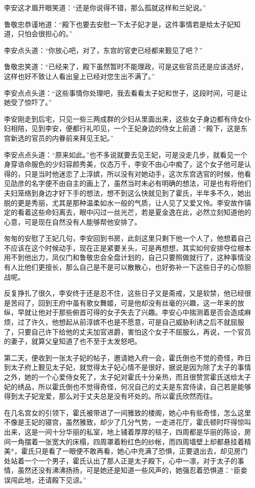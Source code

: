 李安这才眉开眼笑道：“还是你说得不错，那么孤就这样和兰妃说。”

鲁敬忠恭谨地道：“殿下也要去安慰一下太子妃才是，这件事情若是给太子妃知道，只怕会很担心的。”

李安点头道：“你放心吧，对了，东宫的官吏已经都来觐见了吧？”

鲁敬忠笑道：“已经来了，殿下虽然暂时不能理政，可是这些官员还是应该选好，这样也好不致让人看出皇上已经对您生出不满了。”

李安点点头道：“这些事情你处理吧，我去看看太子妃和世子，这段时间，可是让她受了惊吓了。”

李安刚走到后宅，只见一些三两成群的少妇从里面出来，这些女子身边都有侍女仆妇相陪，见到李安，便都行礼叩见，一个王妃身边的侍女上前道：“殿下，这是东宫新选的官员的内眷前来拜见王妃。”

李安点点头道：“原来如此。”也不多说就要去见王妃，可是没走几步，就看见一个身穿诰命服色的少妇容颜秀美，仪态万千，李安不由心中痴了，这个女子他可是认得的，只是当时他迷恋了上淳嫔，所以没有对她动手，这次东宫选官的时候，他看见劭彦的名字便不由自主的画上了，虽然当时未必有明确的想法，可是也有将他们夫妇笼络到身边才好下手的想法，想不到这么快就见到了霍氏，半年多不久，她出脱的更是秀丽，尤其是那种温柔如水一般的气质，让人见了又爱又怜。李安故作镇定的看着这些命妇离去，眼中闪过一丝光芒，若是夏金逸在此，必然立刻知道他的心意，可是现在自然没有人能够帮他安排了。

匆匆的安慰了王妃几句，李安回到书房，此刻这里只剩下他一个人了，他想着自己不应该在这个时候动手，现在正是紧要关头，可是再想想，其实如何安排夺位根本用不到他出力，凤仪门和鲁敬忠会全盘计划的，自己只要照做就行了，这种事情没有人比他们更擅长，那么自己是不是可以散散心，也好弥补一下这些日子的心惊胆战呢。

反复挣扎了很久，李安终于还是忍不住，这些日子又是斋戒，又是软禁，他已经很是苦闷了，回到王府中虽有歌女舞姬，可是他却没有丝毫的兴趣，这一年来的放纵，早就让他对于那些俯首可得的女子失去了兴趣。李安心中揣测着是否会造成麻烦，过了许久，他想起从前淳嫔不也是不愿意，可是自己威胁利诱之后不就屈服了，只要自己许下给他的丈夫加官进爵，害怕这个女子不屈服么，再说，一个官员的妻子，就算父皇知道了也不至于太发怒吧。

第二天，便收到一张太子妃的帖子，邀请她入府一会，霍氏倒也不觉的奇怪，昨日到太子府上觐见太子妃，就觉得太子妃心情不是很好，据说是因为除了太子的事情之外，她的一个心爱侍女死了，太子妃对霍氏十分亲热，而且很赞赏霍氏送给太子妃的绣品，所以霍氏倒也不觉得奇怪，何况自己的丈夫是东宫侍读，自己若是能够得到太子妃宠爱，那么对于丈夫总是没有坏处的。所以霍氏欣然而往。

在几名宫女的引领下，霍氏被带进了一间雅致的楼阁，她心中有些奇怪，怎么这里不像是王妃的寝宫，虽然雅致，却少了几分气势，一走进花厅，霍氏顿时吓得惊叫出来，这是一间十分华丽的私室，地上铺着厚厚的毯子，四周都是华丽的陈设，房间一角摆着一张宽大的床榻，四周罩着粉红色的纱帐，而四周墙壁上却都悬挂着精美*，霍氏只是看了一眼便不敢再看，她心中充满了恐惧，正要退出去，却见房门处站着一个一个男子，霍氏认出了那人正是太子殿下，心中一凛，对于太子的事情，虽然还没有沸沸扬扬，可是她还是知道一些风声的，她强忍着恐惧道：“臣妾误闯此地，还请殿下见谅。”

